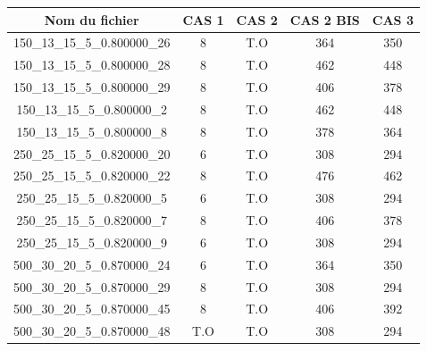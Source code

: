 \documentclass[a4paper, 10pt]{article}
\begin{document}
        \begin{table}[!h]
          \centering
          \begin{tabular}{ |c|c|c|c|c| }
          \hline
          \textbf{Nom du fichier} & \textbf{CAS 1} & \textcolor[gray]{0.6}{\textbf{CAS 2}}   & \textbf{CAS 2 BIS} & \textbf{CAS 3} \\
          \hline \hline
          \scriptsize{150\_13\_15\_5\_0.800000\_26} & 8 & \textcolor[gray]{0.6}{ T.O} & 364 & 350\\
          \hline
          \scriptsize{150\_13\_15\_5\_0.800000\_28} & 8 & \textcolor[gray]{0.6}{ T.O} & 462  &  448\\
          \hline
          \scriptsize{150\_13\_15\_5\_0.800000\_29} & 8 & \textcolor[gray]{0.6}{ T.O} & 406 &  378\\
          \hline
          \scriptsize{150\_13\_15\_5\_0.800000\_2} & 8 & \textcolor[gray]{0.6}{ T.O} & 462 & 448\\
          \hline
          \scriptsize{150\_13\_15\_5\_0.800000\_8} & 8 & \textcolor[gray]{0.6}{ T.O} & 378 & 364 \\
          \hline \hline
          \scriptsize{250\_25\_15\_5\_0.820000\_20} & 6 & \textcolor[gray]{0.6}{ T.O} &  308 & 294 \\
          \hline
          \scriptsize{250\_25\_15\_5\_0.820000\_22} & 8 & \textcolor[gray]{0.6}{ T.O} & 476 & 462\\
          \hline
          \scriptsize{250\_25\_15\_5\_0.820000\_5} & 6 & \textcolor[gray]{0.6}{ T.O} & 308 &  294\\
          \hline
          \scriptsize{250\_25\_15\_5\_0.820000\_7} & 8 & \textcolor[gray]{0.6}{ T.O} &406  &378  \\
          \hline
          \scriptsize{250\_25\_15\_5\_0.820000\_9} & 6 & \textcolor[gray]{0.6}{ T.O} & 308 & 294 \\
          \hline \hline
          \scriptsize{500\_30\_20\_5\_0.870000\_24} & 6 & \textcolor[gray]{0.6}{ T.O} & 364&  350\\
          \hline
          \scriptsize{500\_30\_20\_5\_0.870000\_29} & 8 & \textcolor[gray]{0.6}{ T.O} & 308  &  294\\
          \hline
          \scriptsize{500\_30\_20\_5\_0.870000\_45} & 8 & \textcolor[gray]{0.6}{ T.O} & 406  & 392\\
          \hline
          \scriptsize{500\_30\_20\_5\_0.870000\_48} & \textcolor[gray]{0.6}{ T.O} & \textcolor[gray]{0.6}{ T.O} & 308 &  294\\

\end{tabular}
\end{table}
\end{document}
